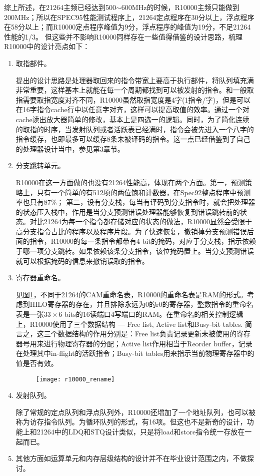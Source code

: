 综上所述，在21264主频已经达到500$ \sim $600MHz的时候，R10000主频只能做到200MHz；所以在SPEC95性能测试程序上，21264定点程序在30分以上，浮点程序在58分以上；而R10000定点程序峰值为9分，浮点程序的峰值为19分，不足21264性能的1/3\citep{Alpha21264,MIPS1996}。 但这些并不影响R10000同样存在一些值得借鉴的设计思路，梳理R10000中的设计亮点如下：
\begin{enumerate}[label=(\alph*)]
	\item 取指部件。
	
	\citep{MIPS1996}提出的设计思路是处理器取回来的指令带宽上要高于执行部件，将队列填充满非常重要，这样基本上就能在每一个周期都找到可以被发射的指令。和一般取指需要取指宽度对齐不同，R10000虽然取指宽度是4字(1指令/字)，但是可以在16字指令cache行中以任意字对齐，这样可以提高取值的效率。通过一个对cache读出放大器简单的修改，基本上是四选一的逻辑。同时，为了简化连续的取指的时序，当发射队列或者活跃表已经满时，指令会被先进入一个八字的指令缓存\citep{MIPS1996}，也即最多可以缓存8条未被译码的指令。这一点已经借鉴到了自己的处理器设计当中，参见第3章节。
	\item 分支跳转单元。
	
	R10000在这一方面做的也没有21264性能高，体现在两个方面。第一，预测策略上，只有一个简单的有512项的两位饱和计数器，在Spec92整点程序中预测率也只有87\%\citep{MIPS1996}； 第二，设有分支栈，每当有译码到分支指令时，就会把处理器的状态压入栈中，作用是当分支预测错误处理器能够恢复到错误跳转前的状态。对比21264为每一个指令都存储对应的状态的做法，R10000显然会受限于高分支指令占比的程序以及程序片段。为了快速恢复，撤销掉分支预测错误后面的指令，R10000的每一条指令都带有4-bit的掩码，对应于分支栈，指示依赖于哪一项分支跳转。如果依赖该条分支指令，该位掩码置上。当分支预测错误就可以根据掩码的信息来撤销误取的指令。
	\item 寄存器重命名。
	
	见图\ref{fig:r10000_rename}，不同于21264的CAM重命名表，R10000的重命名表是RAM的形式。考虑到HILO寄存器的存在，并且排除永远为$ 0 $的r0的寄存器，整数指令的重命名表是一张$ 33\times 6 $ bits的16读端口4写端口的RAM\citep{MIPS1996}。在重命名的相关控制逻辑上，R10000使用了三个数据结构 --- Free list, Active list和Busy-bit tables. 简言之，这三个数据结构的作用分别是：Free list负责记录更新未被使用的寄存器号用来进行物理寄存器的分配；Active list作用相当于Reorder buffer，记录在处理其中in-flight的活跃指令；Busy-bit tables用来指示当前物理寄存器中的值是否有效。
	\begin{figure}[!htbp]
		\centering
		\texttt{[image: r10000\_rename]}
		\label{fig:r10000_rename}
	\end{figure}
	
	\item 发射队列。
	
	除了常规的定点队列和浮点队列外，R10000还增加了一个地址队列，也可以被称为访存指令队列。为循环队列的形式，有16项。但这也不是新奇的设计，功能上和21264中的LDQ和STQ设计类似，只是将load和store指令统一存放在一起而已。
	\item 其他方面如运算单元和内存层级结构的设计并不在毕业设计范围之内，不做探讨。
\end{enumerate}

